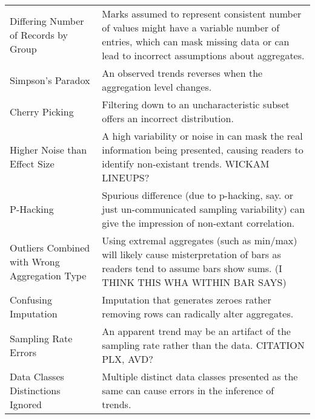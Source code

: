 \begin{table*}[]
\begin{tabular}{p{5cm}p{12cm}}
   \rowcolor{colorb}\multirow{9}{0em}{\hspace{-0.6cm}\rotatebox{90}{\normalsize{Wrangling}}}Differing Number of Records by Group & Marks assumed to represent consistent number of values might have a variable number of entries, which can mask missing data or can lead to incorrect assumptions about aggregates. \\
 \rowcolor{colorb-opaque}Simpson's Paradox & An observed trends reverses when the aggregation level changes. \cite{guo2017you}\\
 \rowcolor{colorb}Cherry Picking & Filtering down to an uncharacteristic subset offers an incorrect distribution. \cite{few2019loom}\\
 \rowcolor{colorb-opaque}Higher Noise than Effect Size & A high variability or noise in can mask the real information being presented, causing readers to identify non-existant trends. WICKAM LINEUPS?\\
 \rowcolor{colorb}P-Hacking & Spurious difference (due to p-hacking, say. or just un-communicated sampling variability) can give the impression of non-extant correlation. \cite{pu2018garden}\\
 \rowcolor{colorb-opaque}Outliers Combined with Wrong Aggregation Type & Using extremal aggregates (such as min/max) will likely cause misterpretation of bars as readers tend to assume bars show sums. (I THINK THIS WHA WITHIN BAR SAYS) \\
 \rowcolor{colorb}Confusing Imputation & Imputation that generates zeroes rather removing rows can radically alter aggregates. \cite{song2018s}\\
 \rowcolor{colorb-opaque}Sampling Rate Errors  & An apparent trend may be an artifact of the sampling rate rather than the data. CITATION PLX, AVD?\\
 \rowcolor{colorb}Data Classes Distinctions Ignored & Multiple distinct data classes presented as the same can cause errors in the inference of trends. \cite{anand2015automatic}\\


\end{tabular}
\end{table*}
